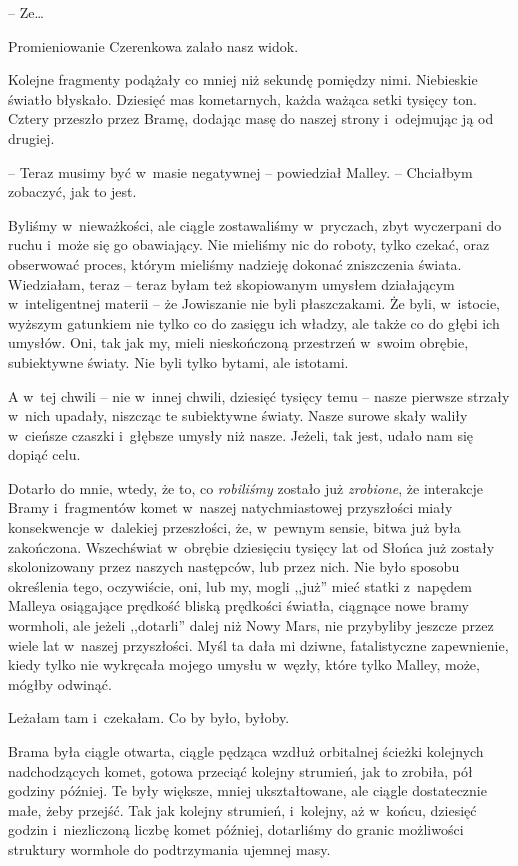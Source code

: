 \documentclass[oneside,polish,11pt,sfheadings]{mwbk}
\begin{document}
-- Ze\ldots 

Promieniowanie Czerenkowa zalało nasz widok.

Kolejne fragmenty podążały co mniej niż sekundę pomiędzy nimi.
Niebieskie światło błyskało. Dziesięć mas kometarnych, każda ważąca
setki tysięcy ton. Cztery przeszło przez Bramę, dodając masę do naszej
strony i~odejmując ją od drugiej.

-- Teraz musimy być w~masie negatywnej -- powiedział Malley. -- Chciałbym
zobaczyć, jak to jest.

Byliśmy w~nieważkości, ale ciągle zostawaliśmy w~pryczach, zbyt
wyczerpani do ruchu i~może się go obawiający. Nie mieliśmy nic do
roboty, tylko czekać, oraz obserwować proces, którym mieliśmy nadzieję
dokonać zniszczenia świata. Wiedziałam, teraz -- teraz byłam też
skopiowanym umysłem działającym w~inteligentnej materii -- że Jowiszanie
nie byli płaszczakami. Że byli, w~istocie, wyższym gatunkiem nie tylko
co do zasięgu ich władzy, ale także co do głębi ich umysłów. Oni, tak
jak my, mieli nieskończoną przestrzeń w~swoim obrębie, subiektywne
światy. Nie byli tylko bytami, ale istotami.

A w~tej chwili -- nie w~innej chwili, dziesięć tysięcy temu -- nasze
pierwsze strzały w~nich upadały, niszcząc te subiektywne światy. Nasze
surowe skały waliły w~cieńsze czaszki i~głębsze umysły niż nasze.
Jeżeli, tak jest, udało nam się dopiąć celu.

Dotarło do mnie, wtedy, że to, co \textit{robiliśmy} zostało już
\textit{zrobione}, że interakcje Bramy i~fragmentów komet w~naszej
natychmiastowej przyszłości miały konsekwencje w~dalekiej przeszłości,
że, w~pewnym sensie, bitwa już była zakończona. Wszechświat w~obrębie
dziesięciu tysięcy lat od Słońca już zostały skolonizowany przez naszych
następców, lub przez nich. Nie było sposobu określenia tego, oczywiście,
oni, lub my, mogli ,,już'' mieć statki z~napędem Malleya osiągające
prędkość bliską prędkości światła, ciągnące nowe bramy wormholi, ale
jeżeli ,,dotarli'' dalej niż Nowy Mars, nie przybyliby jeszcze przez
wiele lat w~naszej przyszłości. Myśl ta dała mi dziwne, fatalistyczne
zapewnienie, kiedy tylko nie wykręcała mojego umysłu w~węzły, które
tylko Malley, może, mógłby odwinąć.

Leżałam tam i~czekałam. Co by było, byłoby.

Brama była ciągle otwarta, ciągle pędząca wzdłuż orbitalnej ścieżki
kolejnych nadchodzących komet, gotowa przeciąć kolejny strumień, jak to
zrobiła, pół godziny później. Te były większe, mniej ukształtowane, ale
ciągle dostatecznie małe, żeby przejść. Tak jak kolejny strumień, i~kolejny, aż w~końcu, dziesięć godzin i~niezliczoną liczbę komet później,
dotarliśmy do granic możliwości struktury wormhole do podtrzymania
ujemnej masy.
\end{document}
